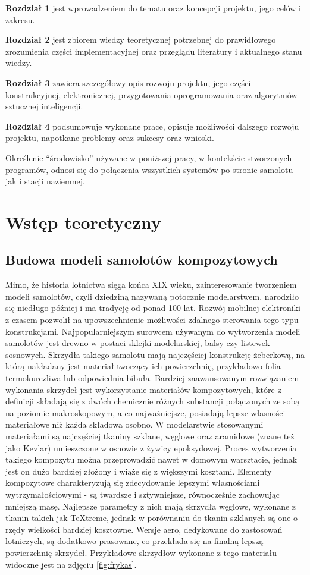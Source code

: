 \documentclass[12pt, a4paper]{article}
\begin{document}
\textbf{Rozdział 1} jest wprowadzeniem do tematu oraz koncepcji projektu, jego celów i zakresu.

\textbf{Rozdział 2} jest zbiorem wiedzy teoretycznej potrzebnej do prawidłowego zrozumienia części implementacyjnej oraz przeglądu literatury i aktualnego stanu wiedzy.

\textbf{Rozdział 3} zawiera szczegółowy opis rozwoju projektu, jego części konstrukcyjnej, elektronicznej, przygotowania oprogramowania oraz algorytmów sztucznej inteligencji.

\textbf{Rozdział 4} podsumowuje wykonane prace, opisuje możliwości dalszego rozwoju projektu, napotkane problemy oraz sukcesy oraz wnioski.

Określenie ``środowisko'' używane w poniższej pracy, w kontekście stworzonych programów, odnosi się do połączenia wszystkich systemów po stronie samolotu jak i stacji naziemnej.

\clearpage
\section{Wstęp teoretyczny}

\subsection{Budowa modeli samolotów kompozytowych}
Mimo, że historia lotnictwa sięga końca XIX wieku, zainteresowanie tworzeniem modeli samolotów, czyli dziedziną nazywaną potocznie modelarstwem, narodziło się niedługo później i ma tradycję od ponad 100 lat. Rozwój mobilnej elektroniki z czasem pozwolił na upowszechnienie możliwości zdalnego sterowania tego typu konstrukcjami. Najpopularniejszym surowcem używanym do wytworzenia modeli samolotów jest drewno w postaci sklejki modelarskiej, balsy czy listewek sosnowych. Skrzydła takiego samolotu mają najczęściej konstrukcję żeberkową, na którą nakładany jest materiał tworzący ich powierzchnię, przykładowo folia termokurczliwa lub odpowiednia bibuła. Bardziej zaawansowanym rozwiązaniem wykonania skrzydeł jest wykorzystanie materiałów kompozytowych, które z definicji składają się z dwóch chemicznie różnych substancji połączonych ze sobą na poziomie makroskopowym, a co najważniejsze, posiadają lepsze własności materiałowe niż każda składowa osobno. W modelarstwie stosowanymi materiałami są najczęściej tkaniny szklane, węglowe oraz aramidowe (znane też jako Kevlar) umieszczone w osnowie z żywicy epoksydowej. Proces wytworzenia takiego kompozytu można przeprowadzić nawet w domowym warsztacie, jednak jest on dużo bardziej złożony i wiąże się z większymi kosztami. Elementy kompozytowe charakteryzują się zdecydowanie lepszymi własnościami wytrzymałościowymi - są twardsze i sztywniejsze, równocześnie zachowując mniejszą masę. Najlepsze parametry z nich mają skrzydła węglowe, wykonane z tkanin takich jak TeXtreme, jednak w porównaniu do tkanin szklanych są one o rzędy wielkości bardziej kosztowne. Wersje aero, dedykowane do zastosowań lotniczych, są dodatkowo prasowane, co przekłada się na finalną lepszą powierzchnię skrzydeł. Przykładowe skrzydłow wykonane z tego materiału widoczne jest na zdjęciu \ref{fig:frykas}.
\end{document}
